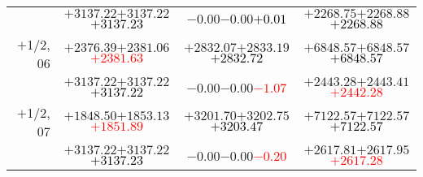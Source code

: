 \documentclass[compress]{beamer}
\begin{document}
\begin{frame}
{\begin{tabular}{r | c | c | c}
           & $+3137.22$\hspace{0.1 cm}$+3137.22$\hspace{0.1 cm}\textcolor{black}{$+3137.23$} & $-0.00$\hspace{0.1 cm}$-0.00$\hspace{0.1 cm}\textcolor{black}{$+0.01$} & $+2268.75$\hspace{0.1 cm}$+2268.88$\hspace{0.1 cm}\textcolor{black}{$+2268.88$} \\
$+$1/2, 06 & $+2376.39$\hspace{0.1 cm}$+2381.06$\hspace{0.1 cm}\textcolor{red}{$+2381.63$} & $+2832.07$\hspace{0.1 cm}$+2833.19$\hspace{0.1 cm}\textcolor{black}{$+2832.72$} & $+6848.57$\hspace{0.1 cm}$+6848.57$\hspace{0.1 cm}\textcolor{black}{$+6848.57$} \\
           & $+3137.22$\hspace{0.1 cm}$+3137.22$\hspace{0.1 cm}\textcolor{black}{$+3137.22$} & $-0.00$\hspace{0.1 cm}$-0.00$\hspace{0.1 cm}\textcolor{red}{$-1.07$} & $+2443.28$\hspace{0.1 cm}$+2443.41$\hspace{0.1 cm}\textcolor{red}{$+2442.28$} \\
$+$1/2, 07 & $+1848.50$\hspace{0.1 cm}$+1853.13$\hspace{0.1 cm}\textcolor{red}{$+1851.89$} & $+3201.70$\hspace{0.1 cm}$+3202.75$\hspace{0.1 cm}\textcolor{black}{$+3203.47$} & $+7122.57$\hspace{0.1 cm}$+7122.57$\hspace{0.1 cm}\textcolor{black}{$+7122.57$} \\
           & $+3137.22$\hspace{0.1 cm}$+3137.22$\hspace{0.1 cm}\textcolor{black}{$+3137.23$} & $-0.00$\hspace{0.1 cm}$-0.00$\hspace{0.1 cm}\textcolor{red}{$-0.20$} & $+2617.81$\hspace{0.1 cm}$+2617.95$\hspace{0.1 cm}\textcolor{red}{$+2617.28$} \\

\end{tabular}}
\end{frame}
\end{document}
